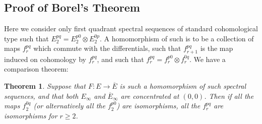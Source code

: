 \documentclass[11pt]{article}
\theoremstyle{plain}
\newtheorem*{thm*}{Theorem}
\theoremstyle{definition}
\renewcommand{\to}{\longrightarrow}
\begin{document}
\subsection{Proof of Borel's Theorem}
Here we consider only first quadrant spectral sequences of standard cohomological type such that $E_2^{pq}=E_2^{p0}\otimes E_2^{0p}$. A homomorphism of such is to be a collection of maps $f_r^{pq}$ which commute with the differentials, such that $f^{pq}_{r+1}$ is the map induced  on cohomology by $f^{pq}_r$, and such that $f_r^{pq}=f_r^{p0}\otimes f_r^{0q}$. We have a comparison theorem:
\begin{thm*}
Suppose that $F:E\to\overline E$ is such a homomorphism of such spectral sequences, and that both $E_\infty$ and $\overline E_\infty$ are concentrated at $(0,0)$. Then if all the maps $f_2^{0q}$ (or alternatively all the $f_2^{p0}$) are isomorphisms, all the $f_r^{pq}$ are isomorphisms for $r\geq2$.
\end{thm*}
\end{document}
